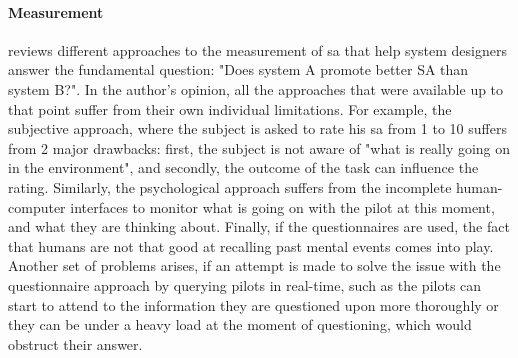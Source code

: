 \paragraph{Measurement}
\cite[p.~791-792]{endsley_situation_1988} reviews different approaches to the measurement of \gls{sa} that help system designers answer the fundamental question: "Does system A promote better SA than system B?". In the author's opinion, all the approaches that were available up to that point suffer from their own individual limitations. For example, the subjective approach, where the subject is asked to rate his \gls{sa} from 1 to 10 suffers from 2 major drawbacks: first, the subject is not aware of "what is really going on in the environment", and secondly, the outcome of the task can influence the rating. Similarly, the psychological approach suffers from the incomplete human-computer interfaces to monitor what is going on with the pilot at this moment, and what they are thinking about. Finally, if the questionnaires are used, the fact that humans are not that good at recalling past mental events comes into play. Another set of problems arises, if an attempt is made to solve the issue with the questionnaire approach by querying pilots in real-time, such as the pilots can start to attend to the information they are questioned upon more thoroughly or they can be under a heavy load at the moment of questioning, which would obstruct their answer.

